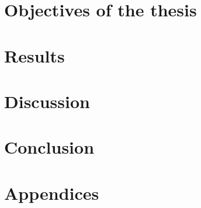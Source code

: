 \documentclass[a4paper,twoside]{ociamthesis}
\begin{document}
\part{Objectives of the thesis}
\label{part:objectives}

\part{Results}
\label{part:results}




\part{Discussion}
\label{part:discussion}


\part*{Conclusion}


% 
% 


\cleardoublepage{}
\startappendices
\part*{Appendices}
% 




%
\setlength{\baselineskip}{0pt} %
\end{document}
